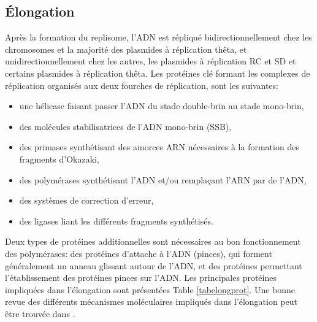 \subsection{Élongation}
	Après la formation du replisome, l'ADN est répliqué bidirectionnellement chez les chromosomes et la majorité des plasmides à réplication thêta, et unidirectionnellement chez les autres, les plasmides à réplication RC et SD et certains plasmides à réplication thêta. Les protéines clé formant les complexes de réplication organisés aux deux fourches de réplication, sont les suivantes: 
\begin{itemize}
\item une hélicase faisant passer l'ADN du stade double-brin au stade mono-brin,
\item des molécules stabilisatrices de l'ADN mono-brin (SSB),
\item des primases synthétisant des amorces ARN nécessaires à la formation des fragments d'Okazaki,
\item des polymérases synthétisant l'ADN et/ou remplaçant l'ARN par de l'ADN,
\item des systèmes de correction d'erreur,
\item des ligases liant les différents fragments synthétisés.
\end{itemize}
	Deux types de protéines additionnelles sont nécessaires au bon fonctionnement des polymérases: des protéines d'attache à l'ADN (pinces), qui forment généralement un anneau glissant autour de l'ADN, et des protéines permettant l'établissement des protéines pinces sur l'ADN. Les principales protéines impliquées dans l'élongation sont présentées Table \ref{tabelongprot}. Une bonne revue des différents mécanismes moléculaires impliqués dans l'élongation peut être trouvée dans \citep{Johnson2005a}. 
  

